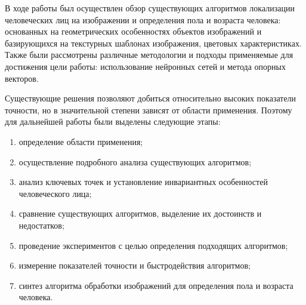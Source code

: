 \Conclusion %

В ходе работы был осуществлен обзор существующих алгоритмов локализации
человеческих лиц на изображении и определения пола и возраста человека:
основанных на геометрических особенностях объектов изображений и базирующихся на
текстурных шаблонах изображения, цветовых характеристиках. Также были
рассмотрены различные методологии и подходы применяемые для достижения цели
работы: использование нейронных сетей и метода опорных векторов. 

Существующие решения позволяют добиться относительно высоких показатели
точности, но в значительной степени зависят от области применения. Поэтому для
дальнейшей работы были выделены следующие этапы:

\begin{enumerate}
\item определение области применения;
\item осуществление подробного анализа существующих алгоритмов;
\item анализ ключевых точек и установление инвариантных особенностей
человеческого лица;
\item сравнение существующих алгоритмов, выделение их достоинств и недостатков; 
\item проведение экспериментов с целью определения подходящих алгоритмов;
\item измерение показателей точности и быстродействия алгоритмов;
\item синтез алгоритма обработки изображений для определения пола и возраста
человека.
\end{enumerate}


